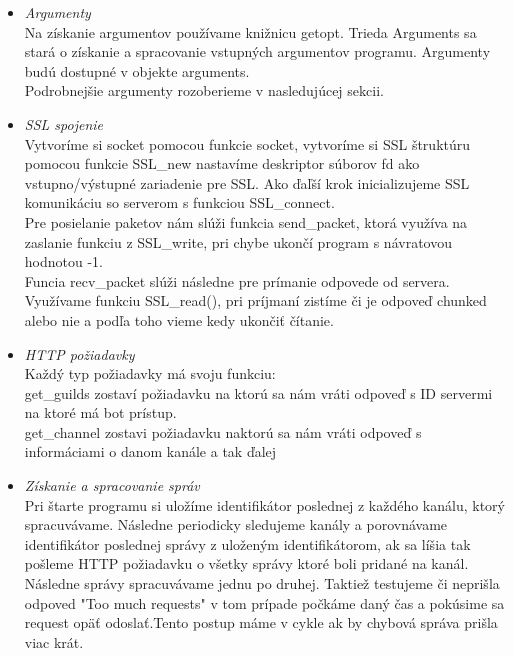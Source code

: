 \documentclass[11pt,a4paper]{article}
\begin{document}
		\begin{itemize}

			\item \textit{Argumenty}\\[0.4em]
			     Na získanie argumentov používame knižnicu getopt.
				 Trieda Arguments sa stará o získanie a spracovanie vstupných argumentov programu. Argumenty budú dostupné v objekte arguments.\\ Podrobnejšie argumenty rozoberieme v nasledujúcej sekcii.
 
			\item \textit{SSL spojenie}\\[0.4em]
				Vytvoríme si socket pomocou funkcie socket, vytvoríme si SSL štruktúru pomocou funkcie SSL\_new nastavíme deskriptor súborov fd ako vstupno/výstupné zariadenie pre SSL. Ako ďaľší krok inicializujeme SSL komunikáciu so serverom s funkciou SSL\_connect.\\
				Pre posielanie paketov nám slúži funkcia send\_packet, ktorá využíva na zaslanie funkciu z SSL\_write, pri chybe ukončí program s návratovou hodnotou -1.\\
				Funcia recv\_packet slúži následne pre prímanie odpovede od servera. Využívame funkciu SSL\_read(), pri príjmaní zistíme či je odpoveď chunked alebo nie a podľa toho vieme kedy ukončiť čítanie.
				

			\item \textit{HTTP požiadavky}\\[0.4em]
				Každý typ požiadavky má svoju funkciu:\\
				get\_guilds zostaví požiadavku na ktorú sa nám vráti odpoveď s ID servermi na ktoré má bot prístup.\\
				get\_channel zostavi požiadavku naktorú sa nám vráti odpoveď s informáciami o danom kanále a tak ďalej
			
			
			\item \textit{Získanie a spracovanie správ}\\[0.4em]
			    Pri štarte programu si uložíme identifikátor poslednej z každého kanálu, ktorý spracuvávame. Následne periodicky sledujeme kanály a porovnávame identifikátor poslednej správy z uloženým identifikátorom, ak sa líšia tak pošleme HTTP požiadavku o všetky správy ktoré boli pridané na kanál. Následne správy spracuvávame jednu po druhej. Taktiež testujeme či neprišla odpoved "Too much requests" v tom prípade počkáme daný čas a pokúsime sa request opäť odoslať.Tento postup máme v cykle ak by chybová správa prišla viac krát.
			
			


		\end{itemize}
\end{document}
